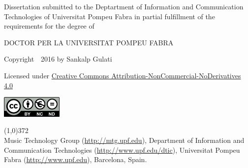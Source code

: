 \cleartorecto
\thispagestyle{empty}

\vspace*{02cm}

Dissertation submitted to the Deptartment of Information and Communication Technologies of Universitat Pompeu Fabra in partial fulfillment of the requirements for the degree of

\vspace*{0.5cm}

\centerline{DOCTOR PER LA UNIVERSITAT POMPEU FABRA}


\vspace*{4cm}


{\centering

	Copyright~\textcopyright~2016 by Sankalp Gulati

	Licensed under \href{http://creativecommons.org/licenses/by-nc-nd/4.0/}{Creative Commons Attribution-NonCommercial-NoDerivatives 4.0}

	\vspace{0.5cm}

	\href{http://creativecommons.org/licenses/by-nc-nd/4.0/}
	{
		\centering
		\includegraphics[width=3cm]{ch00/figures/creative-commons.png}
		}

}

\vspace*{\fill}

\line(1,0){372}\\
\footnotesize
Music Technology Group (\url{http://mtg.upf.edu}), Department of Information and Communication Technologies (\url{http://www.upf.edu/dtic}), Universitat Pompeu Fabra (\url{http://www.upf.edu}), Barcelona, Spain.
\normalsize



